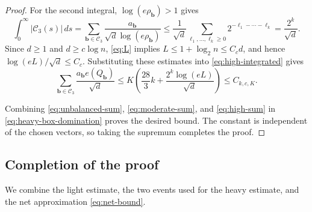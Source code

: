 \documentclass[11pt,reqno]{amsart}
\numberwithin{equation}{section}
\theoremstyle{definition}
\theoremstyle{remark}
\begin{document}
\begin{proof}
For the second integral, $\log(e\rho_{\mathbf b})>1$ gives
\begin{equation}\label{eq:overhead-sum}
 \int_0^\infty|\mathcal C_3(s)|\,ds
 =\sum_{\mathbf b\in\mathcal C_3}
       \frac{a_{\mathbf b}}{\sqrt d\log(e\rho_{\mathbf b})}
 \le\frac1{\sqrt d}\sum_{\ell_1,\ldots,\ell_k\ge0}
       2^{-\ell_1-\cdots-\ell_k}
 =\frac{2^k}{\sqrt d}.
\end{equation}
Since $d\ge1$ and $d\ge c\log n$, \eqref{eq:L} implies
$L\le1+\log_2 n\le C_c d$, and hence
$\log(eL)/\sqrt d\le C_c$.
Substituting these estimates into \eqref{eq:high-integrated} gives
\begin{equation}\label{eq:high-sum}
 \sum_{\mathbf b\in\mathcal C_3}\frac{a_{\mathbf b}e(Q_{\mathbf b})}{\sqrt d}
 \le K\left(\frac{28}{3}k+
                 \frac{2^k\log(eL)}{\sqrt d}\right)
 \le C_{k,c,K}.
\end{equation}

Combining \eqref{eq:unbalanced-sum}, \eqref{eq:moderate-sum}, and
\eqref{eq:high-sum} in \eqref{eq:heavy-box-domination} proves the desired
bound. The constant is independent of the chosen vectors, so taking
the supremum completes the proof.
\end{proof}

\subsection{Completion of the proof}\label{sec:completion}

We combine the light estimate, the two events used for the heavy
estimate, and the net approximation \eqref{eq:net-bound}.
\end{document}

